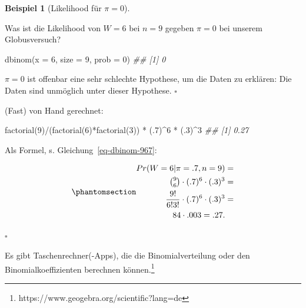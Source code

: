 \documentclass[
  ngerman,
  letterpaper,
  twoside,
  open=any]{scrbook}
\newenvironment{Shaded}{\begin{snugshade}}{\end{snugshade}}
\newcommand{\AttributeTok}[1]{\textcolor[rgb]{0.40,0.45,0.13}{#1}}
\newcommand{\DecValTok}[1]{\textcolor[rgb]{0.68,0.00,0.00}{#1}}
\newcommand{\DocumentationTok}[1]{\textcolor[rgb]{0.37,0.37,0.37}{\textit{#1}}}
\newcommand{\FunctionTok}[1]{\textcolor[rgb]{0.28,0.35,0.67}{#1}}
\newcommand{\NormalTok}[1]{\textcolor[rgb]{0.00,0.23,0.31}{#1}}
\newcommand{\SpecialCharTok}[1]{\textcolor[rgb]{0.37,0.37,0.37}{#1}}
\theoremstyle{definition}
\newtheorem{example}{Beispiel}[chapter]
\theoremstyle{plain}
\theoremstyle{definition}
\theoremstyle{definition}
\theoremstyle{definition}
\newtheorem{example}{Beispiel}[chapter]
\theoremstyle{definition}
\theoremstyle{remark}
\begin{document}
\begin{example}[Likelihood für
\(\pi=0\)]\protect\hypertarget{exm-globus697}{}\label{exm-globus697}

Was ist die Likelihood von \(W=6\) bei \(n=9\) gegeben \(\pi=0\) bei
unserem Globusversuch?

\begin{Shaded}
\begin{Highlighting}[]
\FunctionTok{dbinom}\NormalTok{(}\AttributeTok{x =} \DecValTok{6}\NormalTok{, }\AttributeTok{size =} \DecValTok{9}\NormalTok{, }\AttributeTok{prob =} \DecValTok{0}\NormalTok{)}
\DocumentationTok{\#\# [1] 0}
\end{Highlighting}
\end{Shaded}

\(\pi=0\) ist offenbar eine sehr schlechte Hypothese, um die Daten zu
erklären: Die Daten sind unmöglich unter dieser Hypothese. \(\square\)

(Fast) von Hand gerechnet:

\begin{Shaded}
\begin{Highlighting}[]
\FunctionTok{factorial}\NormalTok{(}\DecValTok{9}\NormalTok{)}\SpecialCharTok{/}\NormalTok{(}\FunctionTok{factorial}\NormalTok{(}\DecValTok{6}\NormalTok{)}\SpecialCharTok{*}\FunctionTok{factorial}\NormalTok{(}\DecValTok{3}\NormalTok{)) }\SpecialCharTok{*}\NormalTok{ (.}\DecValTok{7}\NormalTok{)}\SpecialCharTok{\^{}}\DecValTok{6} \SpecialCharTok{*}\NormalTok{ (.}\DecValTok{3}\NormalTok{)}\SpecialCharTok{\^{}}\DecValTok{3}
\DocumentationTok{\#\# [1] 0.27}
\end{Highlighting}
\end{Shaded}

Als Formel, s. Gleichung~\ref{eq-dbinom-967}:

\begin{equation}\protect\phantomsection\label{eq-dbinom-967}{\begin{aligned}
Pr(W=6 | \pi=.7, n=9) &=\\ 
\tbinom{9}{6} \cdot (.7)^6 \cdot (.3)^3 &=\\
\frac{9!}{6!3!} \cdot (.7)^6 \cdot (.3)^3 &=\\
84 \cdot  .003 = .27.
\end{aligned}}\end{equation}

\(\square\)

\end{example}

Es gibt Taschenrechner(-Apps), die die Binomialverteilung oder den
Binomialkoeffizienten berechnen können.\footnote{https://www.geogebra.org/scientific?lang=de}
\end{document}
